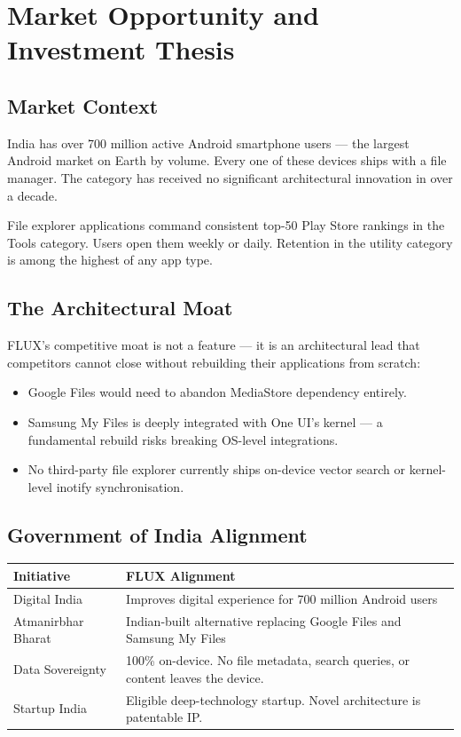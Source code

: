 \chapter{Market Opportunity and Investment Thesis}

\section{Market Context}

India has over 700 million active Android smartphone users --- the largest Android market on Earth by volume. Every one of these devices ships with a file manager. The category has received no significant architectural innovation in over a decade.

File explorer applications command consistent top-50 Play Store rankings in the Tools category. Users open them weekly or daily. Retention in the utility category is among the highest of any app type.

\section{The Architectural Moat}

FLUX's competitive moat is not a feature --- it is an architectural lead that competitors cannot close without rebuilding their applications from scratch:

\begin{itemize}
  \item Google Files would need to abandon MediaStore dependency entirely.
  \item Samsung My Files is deeply integrated with One UI's kernel --- a fundamental rebuild risks breaking OS-level integrations.
  \item No third-party file explorer currently ships on-device vector search or kernel-level inotify synchronisation.
\end{itemize}

\section{Government of India Alignment}

\begin{longtable}{@{}p{44mm}p{92mm}@{}}
\toprule
\textbf{Initiative} & \textbf{FLUX Alignment} \\
\midrule
Digital India & Improves digital experience for 700 million Android users \\
Atmanirbhar Bharat & Indian-built alternative replacing Google Files and Samsung My Files \\
Data Sovereignty & 100\% on-device. No file metadata, search queries, or content leaves the device. \\
Startup India & Eligible deep-technology startup. Novel architecture is patentable IP. \\
\bottomrule
\end{longtable}


